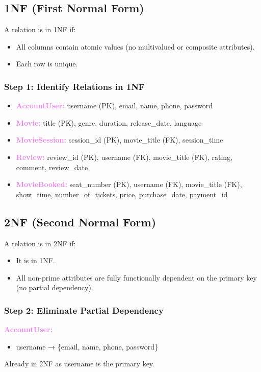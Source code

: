 \documentclass[a4paper,12pt]{article}  %
\renewcommand{\textbf}[1]{\textcolor{violet}{\bfseries #1}}
\begin{document}
\subsection{1NF (First Normal Form)}

A relation is in 1NF if:
\begin{itemize}
    \item All columns contain atomic values (no multivalued or composite attributes).
    \item Each row is unique.
\end{itemize}

\subsubsection*{Step 1: Identify Relations in 1NF}
\begin{itemize}
    \item \textbf{AccountUser:} username (PK), email, name, phone, password
    \item \textbf{Movie:} title (PK), genre, duration, release\_date, language
    \item \textbf{MovieSession:} session\_id (PK), movie\_title (FK), session\_time
    \item \textbf{Review:} review\_id (PK), username (FK), movie\_title (FK), rating, comment, review\_date
    \item \textbf{MovieBooked:} seat\_number (PK), username (FK), movie\_title (FK), show\_time, number\_of\_tickets, price, purchase\_date, payment\_id
\end{itemize}

\subsection{2NF (Second Normal Form)}

A relation is in 2NF if:
\begin{itemize}
    \item It is in 1NF.
    \item All non-prime attributes are fully functionally dependent on the primary key (no partial dependency).
\end{itemize}

\subsubsection*{Step 2: Eliminate Partial Dependency}

\textbf{AccountUser:}
\begin{itemize}
    \item username → \{email, name, phone, password\}
\end{itemize}
Already in 2NF as username is the primary key.
\end{document}
